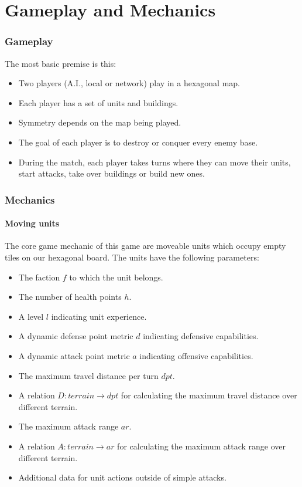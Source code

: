 \part{Gameplay and Mechanics}
\section{Gameplay}
The most basic premise is this:

\begin{itemize}
\item Two players (A.I., local or network) play in a hexagonal map.
\item Each player has a set of units and buildings.
\item Symmetry depends on the map being played.
\item The goal of each player is to destroy or conquer every enemy base.
\item During the match, each player takes turns where they can move their units, start attacks, take over buildings or build new ones.
\end{itemize}
\section{Mechanics}
\subsection{Moving units} %
The core game mechanic of this game are moveable units which occupy empty tiles on our hexagonal board.
The units have the following parameters:

\begin{itemize}
    \item The faction $f$ to which the unit belongs.
    \item The number of health points $h$.
    \item A level $l$ indicating unit experience.
    \item A dynamic defense point metric $d$ indicating defensive capabilities.
    \item A dynamic attack point metric $a$ indicating offensive capabilities.
    \item The maximum travel distance per turn $dpt$.
    \item A relation $D: terrain \to dpt$ for calculating the maximum travel distance over different terrain.
    \item The maximum attack range $ar$.
    \item A relation $A: terrain \to ar$ for calculating the maximum attack range over different terrain.
    \item Additional data for unit actions outside of simple attacks.
\end{itemize}
